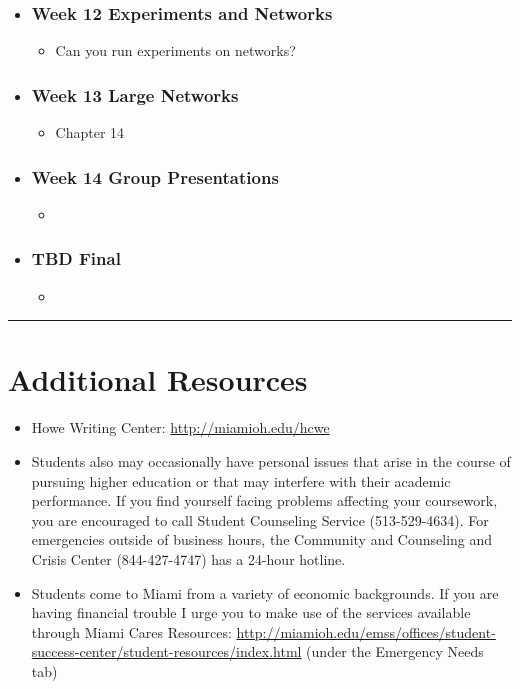 \documentclass[11pt]{article}
\newenvironment{courseday}[2]{
\begin{itemize}
	\item[] \subsubsection*{\textbf{#1} #2}
	\begin{itemize}
}{
\end{itemize}
\end{itemize}
}
\begin{document}
\begin{courseday}{Week  12}{Experiments and Networks}
	\item[] Can you run experiments on networks?
	
\end{courseday}

\begin{courseday}{Week 13}{Large Networks}
	\item[] Chapter 14
\end{courseday}

\begin{courseday}{Week 14}{Group Presentations}
	\item[] 

\end{courseday}


\begin{courseday}{TBD}{Final}
	\item[]
\end{courseday}

\hrule
\vspace{.25cm}
\section*{\textbf{Additional Resources} }
\begin{itemize}
	\item Howe Writing Center: \url{http://miamioh.edu/hcwe}
	\item Students also may occasionally have personal issues that arise in the course of pursuing higher education or that may interfere with their academic performance. If you find yourself facing problems affecting your coursework, you are encouraged to call Student Counseling Service (513-529-4634). For emergencies outside of business hours, the Community and Counseling and Crisis Center (844-427-4747) has a 24-hour hotline. 
	\item Students come to Miami from a variety of economic backgrounds. If you are having financial trouble I urge you to make use of the services available through Miami Cares Resources: \url{http://miamioh.edu/emss/offices/student-success-center/student-resources/index.html} (under the Emergency Needs tab)
	
\end{itemize}
\end{document}
